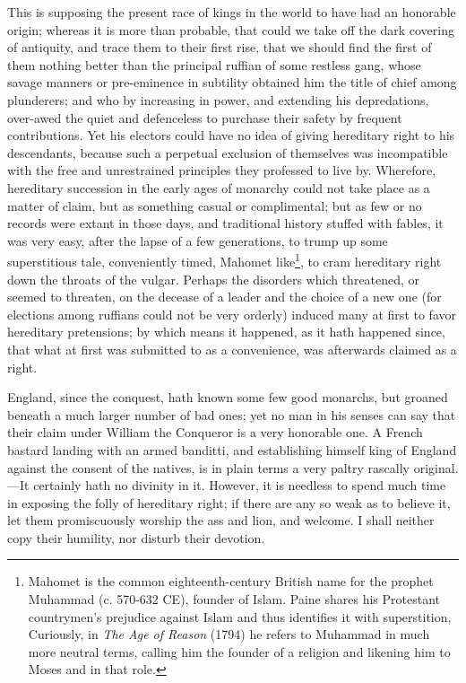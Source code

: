 \documentclass[12pt, twocolumn]{book}
\begin{document}
    This is supposing the present race of kings in the world to have had an honorable origin; whereas it is more than probable, that could we take off the dark covering of antiquity, and trace them to their first rise, that we should find the first of them nothing better than the principal ruffian of some restless gang, whose savage manners or pre-eminence in subtility obtained him the title of chief among plunderers; and who by increasing in power, and extending his depredations, over-awed the quiet and defenceless to purchase their safety by frequent contributions. Yet his electors could have no idea of giving hereditary right to his descendants, because such a perpetual exclusion of themselves was incompatible with the free and unrestrained principles they professed to live by. Wherefore, hereditary succession in the early ages of monarchy could not take place as a matter of claim, but as something casual or complimental; but as few or no records were extant in those days, and traditional history stuffed with fables, it was very easy, after the lapse of a few generations, to trump up some superstitious tale, conveniently timed, Mahomet like\footnote{Mahomet is the common eighteenth-century British name for the prophet Muhammad (c. 570-632 CE), founder of Islam. Paine shares his Protestant countrymen's prejudice against Islam and thus identifies it with superstition, Curiously, in \textit{The Age of Reason} (1794) he refers to Muhammad in much more neutral terms, calling him the founder of a religion and likening him to Moses and in that role.}, to cram hereditary right down the throats of the vulgar. Perhaps the disorders which threatened, or seemed to threaten, on the decease of a leader and the choice of a new one (for elections among ruffians could not be very orderly) induced many at first to favor hereditary pretensions; by which means it happened, as it hath happened since, that what at first was submitted to as a convenience, was afterwards claimed as a right.

    England, since the conquest, hath known some few good monarchs, but groaned beneath a much larger number of bad ones; yet no man in his senses can say that their claim under William the Conqueror is a very honorable one. A French bastard landing with an armed banditti, and establishing himself king of England against the consent of the natives, is in plain terms a very paltry rascally original.—It certainly hath no divinity in it. However, it is needless to spend much time in exposing the folly of hereditary right; if there are any so weak as to believe it, let them promiscuously worship the ass and lion, and welcome. I shall neither copy their humility, nor disturb their devotion.
\end{document}
